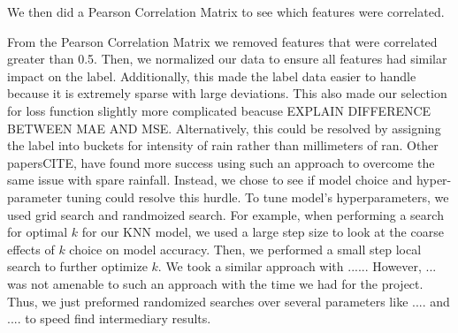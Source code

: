 \documentclass[../report.tex]{subfiles}
\begin{document}
We then did a Pearson Correlation Matrix to see which features were correlated.
\begin{figure}[!ht]
    \centering

    \label{fig:pearson_corr}
\end{figure}
From the Pearson Correlation Matrix we removed features that were correlated greater than 0.5.
Then, we normalized our data to ensure all features had similar impact on the label. 
Additionally, this made the label data easier to handle because it is extremely sparse with large deviations. 
This also made our selection for loss function slightly more complicated beacuse EXPLAIN DIFFERENCE BETWEEN MAE AND MSE. 
Alternatively, this could be resolved by assigning the label into buckets for intensity of rain rather than millimeters of ran. 
Other papersCITE, have found more success using such an approach to overcome the same issue with spare rainfall. 
Instead, we chose to see if model choice and hyper-parameter tuning could resolve this hurdle. 
To tune model's hyperparameters, we used grid search and randmoized search. 
For example, when performing a search for optimal $k$ for our KNN model, we used a large step size to look at the coarse effects of $k$ choice on model accuracy. 
Then, we performed a small step local search to further optimize $k$. 
We took a similar approach with ......
However, ... was not amenable to such an approach with the time we had for the project. 
Thus, we just preformed randomized searches over several parameters like .... and .... to speed find intermediary results.
\end{document}
